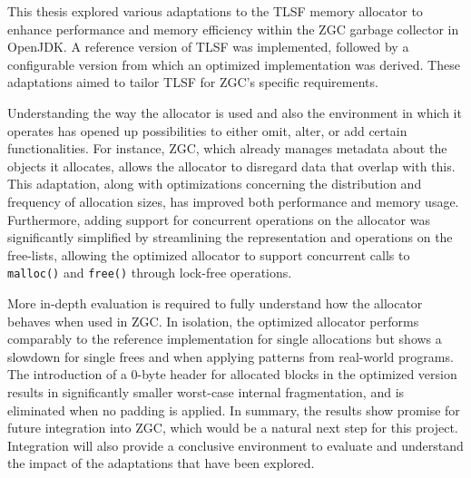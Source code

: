 
This thesis explored various adaptations to the TLSF memory allocator to enhance performance and memory efficiency within the ZGC garbage collector in OpenJDK. A reference version of TLSF was implemented, followed by a configurable version from which an optimized implementation was derived. These adaptations aimed to tailor TLSF for ZGC's specific requirements.

Understanding the way the allocator is used and also the environment in which it operates has opened up possibilities to either omit, alter, or add certain functionalities. For instance, ZGC, which already manages metadata about the objects it allocates, allows the allocator to disregard data that overlap with this. This adaptation, along with optimizations concerning the distribution and frequency of allocation sizes, has improved both performance and memory usage. Furthermore, adding support for concurrent operations on the allocator was significantly simplified by streamlining the representation and operations on the free-lists, allowing the optimized allocator to support concurrent calls to \texttt{malloc()} and \texttt{free()} through lock-free operations.

More in-depth evaluation is required to fully understand how the allocator behaves when used in ZGC. In isolation, the optimized allocator performs comparably to the reference implementation for single allocations but shows a slowdown for single frees and when applying patterns from real-world programs. The introduction of a 0-byte header for allocated blocks in the optimized version results in significantly smaller worst-case internal fragmentation, and is eliminated when no padding is applied. In summary, the results show promise for future integration into ZGC, which would be a natural next step for this project. Integration will also provide a conclusive environment to evaluate and understand the impact of the adaptations that have been explored.

